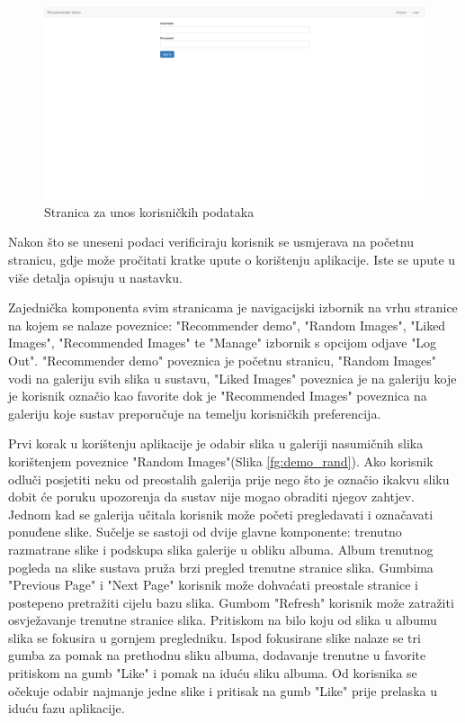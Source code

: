 \documentclass[times, utf8, proizvoljni, numeric]{fer}
\begin{document}
\begin{figure}[!ht]
	\begin{center}
		\captionsetup{justification=centering}
		\includegraphics[width=1.0\textwidth]{./imgs/demo-preporucitelja-po-sadrzaju/tijek-rada/demo-login.png}
		\caption{Stranica za unos korisničkih podataka}
		\label{fg:demo_login}
	\end{center}
\end{figure}

Nakon što se uneseni podaci verificiraju korisnik se usmjerava na početnu stranicu, gdje može pročitati kratke upute o korištenju aplikacije. Iste se upute u više detalja opisuju u nastavku.

Zajednička komponenta svim stranicama je navigacijski izbornik na vrhu stranice na kojem se nalaze poveznice: "Recommender demo", "Random Images", "Liked Images", "Recommended Images" te "Manage" izbornik s opcijom odjave "Log Out". "Recommender demo" poveznica je početnu stranicu, "Random Images" vodi na galeriju svih slika u sustavu, "Liked Images" poveznica je na galeriju koje je korisnik označio kao favorite dok je "Recommended Images" poveznica na galeriju koje sustav preporučuje na temelju korisničkih preferencija.

Prvi korak u korištenju aplikacije je odabir slika u galeriji nasumičnih slika korištenjem poveznice "Random Images"(Slika \ref{fg:demo_rand}). Ako korisnik odluči posjetiti neku od preostalih galerija prije nego što je označio ikakvu sliku dobit će poruku upozorenja da sustav nije mogao obraditi njegov zahtjev. Jednom kad se galerija učitala korisnik može početi pregledavati i označavati ponuđene slike. Sučelje se sastoji od dvije glavne komponente: trenutno razmatrane slike i podskupa slika galerije u obliku albuma. Album trenutnog pogleda na slike sustava pruža brzi pregled trenutne stranice slika. Gumbima "Previous Page" i "Next Page" korisnik može dohvaćati preostale stranice i postepeno pretražiti cijelu bazu slika. Gumbom "Refresh" korisnik može zatražiti osvježavanje trenutne stranice slika. Pritiskom na bilo koju od slika u albumu slika se fokusira u gornjem pregledniku. Ispod fokusirane slike nalaze se tri gumba za pomak na prethodnu sliku albuma, dodavanje trenutne u favorite pritiskom na gumb "Like" i pomak na iduću sliku albuma. Od korisnika se očekuje odabir najmanje jedne slike i pritisak na gumb "Like" prije prelaska u iduću fazu aplikacije.
\end{document}
